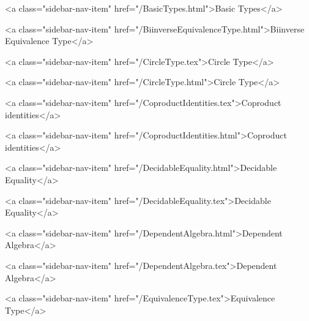       
    
      
        
          <a class="sidebar-nav-item" href="/BasicTypes.html">Basic Types</a>
        
      
    
      
        
          <a class="sidebar-nav-item" href="/BiinverseEquivalenceType.html">Biinverse Equivalence Type</a>
        
      
    
      
        
          <a class="sidebar-nav-item" href="/CircleType.tex">Circle Type</a>
        
      
    
      
        
          <a class="sidebar-nav-item" href="/CircleType.html">Circle Type</a>
        
      
    
      
        
          <a class="sidebar-nav-item" href="/CoproductIdentities.tex">Coproduct identities</a>
        
      
    
      
        
          <a class="sidebar-nav-item" href="/CoproductIdentities.html">Coproduct identities</a>
        
      
    
      
        
          <a class="sidebar-nav-item" href="/DecidableEquality.html">Decidable Equality</a>
        
      
    
      
        
          <a class="sidebar-nav-item" href="/DecidableEquality.tex">Decidable Equality</a>
        
      
    
      
        
          <a class="sidebar-nav-item" href="/DependentAlgebra.html">Dependent Algebra</a>
        
      
    
      
        
          <a class="sidebar-nav-item" href="/DependentAlgebra.tex">Dependent Algebra</a>
        
      
    
      
        
          <a class="sidebar-nav-item" href="/EquivalenceType.tex">Equivalence Type</a>
        
